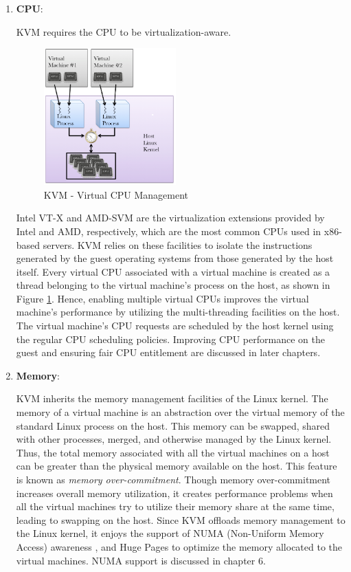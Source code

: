\begin{enumerate}
\item \textbf{CPU}:

KVM requires the CPU to be virtualization-aware. 
\begin{figure}[htbp]
\centering
    \includegraphics[width=0.48\textwidth]{kvm-cpu.png}
  \caption{KVM - Virtual CPU Management}
  \label{img_kvm_thread}
\end{figure}
Intel VT-X \cite{intelvtx} and AMD-SVM \cite{amdv} are the virtualization extensions provided by Intel and AMD, respectively, which are the most common CPUs used in x86-based servers. KVM relies on these facilities to isolate the instructions generated by the guest operating systems from those generated by the host itself. Every virtual CPU associated with a virtual machine is created as a thread belonging to the virtual machine's process on the host, as shown in Figure \ref{img_kvm_thread}. Hence, enabling multiple virtual CPUs improves the virtual machine's performance by utilizing the multi-threading facilities on the host. The virtual machine's CPU requests are scheduled by the host kernel using the regular CPU scheduling policies. Improving CPU performance on the guest and ensuring fair CPU entitlement are discussed in later chapters.   

\item \textbf{Memory}:

KVM inherits the memory management facilities of the Linux kernel. The memory of a virtual machine is an abstraction over the virtual memory of the standard Linux process on the host. This memory can be swapped, shared with other processes, merged, and  otherwise managed by the Linux kernel. Thus, the total memory associated with all the virtual machines on a host can be greater than the physical memory available on the host. This feature is known as \emph{memory over-commitment}. Though memory over-commitment increases overall memory utilization, it creates performance problems when all the virtual machines try to utilize their memory share at the same time, leading to swapping on the host. Since KVM offloads memory management to the Linux kernel, it enjoys the support of NUMA (Non-Uniform Memory Access) awareness \cite{numa}, and Huge Pages \cite{huge_pages} to optimize the memory allocated to the virtual machines. NUMA support is discussed in chapter 6.
   

\end{enumerate}
